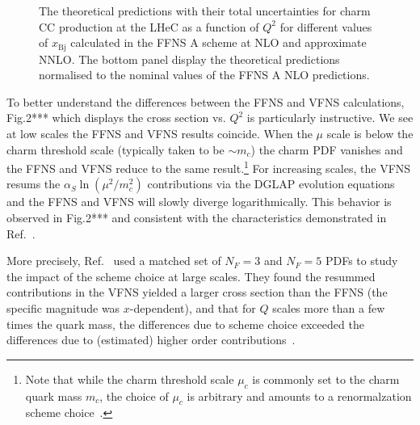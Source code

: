 \documentclass[pdftex,twocolumn,epjc3]{svjour3}          %
\newcommand{\xbj}{\ensuremath{x_{\text{Bj}}}\xspace}
\newcommand{\ffns} {{FFNS A}\xspace}
\begin{document}
\begin{figure}
    \centering
    \caption{The theoretical predictions with their total uncertainties for charm CC production at the LHeC as a function of $Q^2$ for different values of \xbj calculated in the \ffns scheme at NLO and approximate NNLO. The bottom panel display the theoretical predictions normalised to the nominal values of the \ffns NLO predictions.}
    \label{fig:thpred-q2-nnlo}
\end{figure}


\color{blue} %
To better understand the differences between the FFNS  and VFNS calculations, 
Fig.2*** which displays the cross section vs. $Q^2$ is particularly instructive. 
We see at low scales the FFNS and  VFNS results coincide. 
When the $\mu$ scale is below the charm threshold scale (typically taken to be $\sim m_c$)
the charm PDF vanishes and the FFNS and VFNS reduce to the same 
result.\footnote{Note that while the charm threshold scale $\mu_c$ is commonly 
set to the charm quark mass $m_c$, 
the choice of  $\mu_c$ is arbitrary and amounts to a 
renormalzation scheme choice~\cite{Bertone:2017ehk}.
}
%
For increasing scales, the VFNS resums the $\alpha_S \ln(\mu^2/m_c^2)$ contributions
via the DGLAP evolution equations and the FFNS and VFNS will slowly diverge logarithmically.
This behavior is observed in Fig.2*** and consistent with the characteristics demonstrated in 
Ref.~\cite{Kusina:2013slm}. 

More precisely, Ref.~\cite{Kusina:2013slm} used a matched set of $N_F=3$ and $N_F=5$ PDFs
to study the impact of the scheme choice at large scales. They found the resummed contributions 
in the VFNS yielded a larger cross section than the FFNS (the specific magnitude was $x$-dependent), and that for $Q$ scales more than a few times the quark mass, the differences due to scheme choice
exceeded the differences due to (estimated) higher order contributions~\cite{Kusina:2013slm}. 
\end{document}
